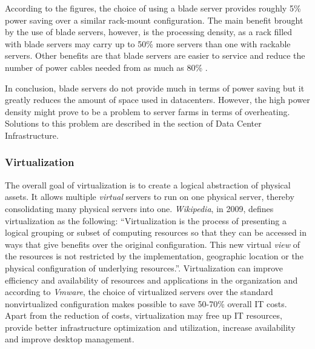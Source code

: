 {            According to the figures, the choice of using a blade server provides roughly 5\% power saving over a similar rack-mount configuration. The main benefit brought by the use of blade servers, however, is the processing density, as a rack filled with blade servers may carry up to 50\% more servers than one with rackable servers. Other benefits are that blade servers are easier to service and reduce the number of power cables needed from as much as 80\% \cite{Hendenson07}. 
            
            In conclusion, blade servers do not provide much in terms of power saving but it greatly reduces the amount of space used in datacenters. However, the high power density might prove to be a problem to server farms in terms of overheating. Solutions to this problem are described in the section of Data Center Infrastructure.
            
            \subsubsection*{Virtualization}
                The overall goal of virtualization is to create a logical abstraction of physical assets. It allows multiple \emph{virtual} servers to run on one physical server, thereby consolidating many physical servers into one. \emph{Wikipedia}, in 2009, defines virtualization as the following: ``Virtualization is the process of presenting a logical grouping or subset of computing resources so that they can be accessed in ways that give benefits over the original configuration. This new virtual \emph{view} of the resources is not restricted by the implementation, geographic location or the physical configuration of underlying resources.''. Virtualization can improve efficiency and availability of resources and applications in the organization and according to \emph{Vmware}, the choice of virtualized servers over the standard nonvirtualized configuration makes possible to save 50-70\% overall IT costs. Apart from the reduction of costs, virtualization may free up IT resources, provide better infrastructure optimization and utilization, increase availability and improve desktop management.
                
}

